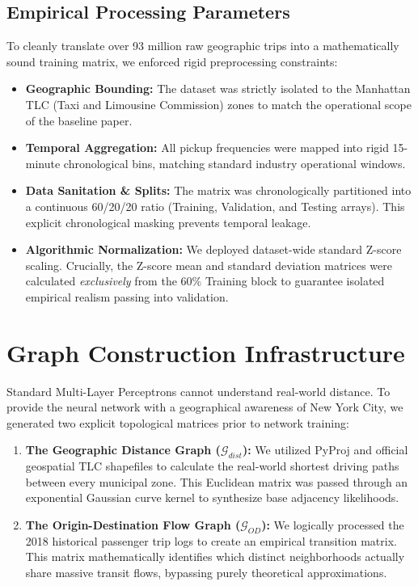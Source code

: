 \documentclass[11pt,a4paper]{article}
\begin{document}
\subsection{Empirical Processing Parameters}
To cleanly translate over 93 million raw geographic trips into a mathematically sound training matrix, we enforced rigid preprocessing constraints:
\begin{itemize}
    \item \textbf{Geographic Bounding:} The dataset was strictly isolated to the Manhattan TLC (Taxi and Limousine Commission) zones to match the operational scope of the baseline paper.
    \item \textbf{Temporal Aggregation:} All pickup frequencies were mapped into rigid 15-minute chronological bins, matching standard industry operational windows.
    \item \textbf{Data Sanitation \& Splits:} The matrix was chronologically partitioned into a continuous 60/20/20 ratio (Training, Validation, and Testing arrays). This explicit chronological masking prevents temporal leakage.
    \item \textbf{Algorithmic Normalization:} We deployed dataset-wide standard Z-score scaling. Crucially, the Z-score mean and standard deviation matrices were calculated \textit{exclusively} from the 60\% Training block to guarantee isolated empirical realism passing into validation.
\end{itemize}

\section{Graph Construction Infrastructure}
Standard Multi-Layer Perceptrons cannot understand real-world distance. To provide the neural network with a geographical awareness of New York City, we generated two explicit topological matrices prior to network training:

\begin{enumerate}
    \item \textbf{The Geographic Distance Graph ($\mathcal{G}_{dist}$):} We utilized PyProj and official geospatial TLC shapefiles to calculate the real-world shortest driving paths between every municipal zone. This Euclidean matrix was passed through an exponential Gaussian curve kernel to synthesize base adjacency likelihoods.
    \item \textbf{The Origin-Destination Flow Graph ($\mathcal{G}_{OD}$):} We logically processed the 2018 historical passenger trip logs to create an empirical transition matrix. This matrix mathematically identifies which distinct neighborhoods actually share massive transit flows, bypassing purely theoretical approximations.
\end{enumerate}
\end{document}
